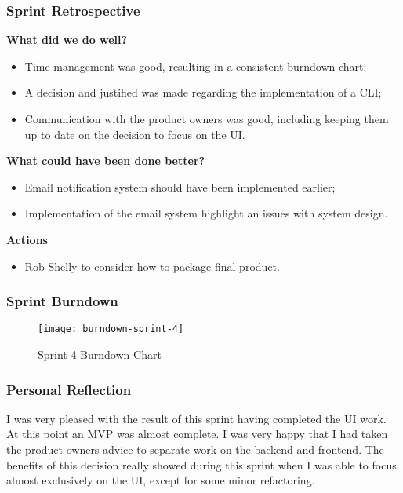     \subsubsection{Sprint Retrospective}
    \textbf{What did we do well?}
    \begin{itemize}
      \item Time management was good, resulting in a consistent burndown chart;
      \item A decision and justified was made regarding the implementation of a CLI;
      \item Communication with the product owners was good, including keeping them up to date on the decision to focus on the UI.
    \end{itemize}
    
    \noindent\textbf{What could have been done better?}
    \begin{itemize}
      \item Email notification system should have been implemented earlier;
      \item Implementation of the email system highlight an issues with system design.
    \end{itemize}
    
    \noindent\textbf{Actions}
    \begin{itemize}
      \item Rob Shelly to consider how to package final product.
    \end{itemize}
    
    \subsubsection{Sprint Burndown}
    
    \begin{figure}[H]
      \setlength{\belowcaptionskip}{15pt plus 3pt minus 2pt}
      \caption{Sprint 4 Burndown Chart}
      \centering
      \texttt{[image: burndown-sprint-4]}
      \label{fig:burndown-sprint-3}
    \end{figure}
    
    \subsubsection{Personal Reflection}
    I was very pleased with the result of this sprint having completed the UI work. At this point an MVP was almost complete. I was very happy that I had taken the product owners advice to separate work on the backend and frontend. The benefits of this decision really showed during this sprint when I was able to focus almost exclusively on the UI, except for some minor refactoring.
    

